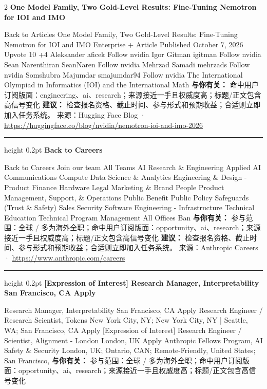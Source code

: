 \documentclass[10.5pt]{ctexart}
\begin{document}
\begin{multicols}{2}
{\large\bfseries One Model Family, Two Gold-Level Results: Fine-Tuning Nemotron for IOI and IMO}\par
Back to Articles One Model Family, Two Gold-Level Results: Fine-Tuning Nemotron for IOI and IMO Enterprise + Article Published October 7, 2026 Upvote 10 +4 Aleksander aficek Follow nvidia Igor Gitman igitman Follow nvidia Sean Narenthiran SeanNaren Follow nvidia Mehrzad Samadi mehrzads Follow nvidia Somshubra Majumdar smajumdar94 Follow nvidia The International Olympiad in Informatics (IOI) and the International Math
\textbf{与你有关：} 命中用户订阅版面：engineering、ai、research；来源接近一手且权威度高；标题/正文包含高信号变化
\textbf{建议：} 检查报名资格、截止时间、参与形式和预期收益；合适则立即加入任务系统。
{\footnotesize\color{ormuted} 来源：Hugging Face Blog · \url{https://huggingface.co/blog/nvidia/nemotron-ioi-and-imo-2026}}
\vspace{2mm}
\hrule height 0.2pt
\vspace{2mm}
{\large\bfseries Back to Careers}\par
Back to Careers Join our team All Teams AI Research \& Engineering Applied AI Communications Compute Data Science \& Analytics Engineering \& Design - Product Finance Hardware Legal Marketing \& Brand People Product Management, Support, \& Operations Public Benefit Public Policy Safeguards (Trust \& Safety) Sales Security Software Engineering - Infrastructure Technical Education Technical Program Management All Offices Ban
\textbf{与你有关：} 参与范围：全球 / 多为海外全职；命中用户订阅版面：opportunity、ai、research；来源接近一手且权威度高；标题/正文包含高信号变化
\textbf{建议：} 检查报名资格、截止时间、参与形式和预期收益；合适则立即加入任务系统。
{\footnotesize\color{ormuted} 来源：Anthropic Careers · \url{https://www.anthropic.com/careers}}
\vspace{2mm}
\hrule height 0.2pt
\vspace{2mm}
{\large\bfseries [Expression of Interest] Research Manager, Interpretability San Francisco, CA Apply}\par
[Expression of Interest] Research Manager, Interpretability San Francisco, CA Apply Research Engineer / Research Scientist, Tokens New York City, NY; New York City, NY | Seattle, WA; San Francisco, CA Apply [Expression of Interest] Research Engineer / Scientist, Alignment - London London, UK Apply Anthropic Fellows Program, AI Safety \& Security London, UK; Ontario, CAN; Remote-Friendly, United States; San Francisco, 
\textbf{与你有关：} 参与范围：全球 / 多为海外全职；命中用户订阅版面：opportunity、ai、research；来源接近一手且权威度高；标题/正文包含高信号变化

\end{multicols}
\end{document}
